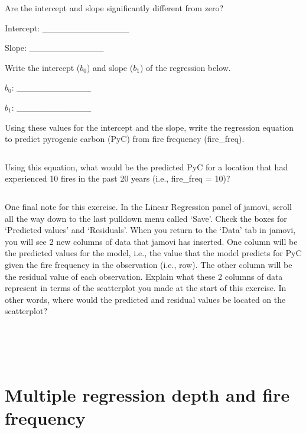 \documentclass[
  openany]{scrbook}
\begin{document}
Are the intercept and slope significantly different from zero?

Intercept: \_\_\_\_\_\_\_\_\_\_\_\_\_\_

Slope: \_\_\_\_\_\_\_\_\_\_\_\_

Write the intercept (\(b_{0}\)) and slope (\(b_{1}\)) of the regression below.

\(b_{0}\): \_\_\_\_\_\_\_\_\_\_\_\_

\(b_{1}\): \_\_\_\_\_\_\_\_\_\_\_\_

Using these values for the intercept and the slope, write the regression equation to predict pyrogenic carbon (PyC) from fire frequency (fire\_freq).

\begin{verbatim}

\end{verbatim}

Using this equation, what would be the predicted PyC for a location that had experienced 10 fires in the past 20 years (i.e., fire\_freq = 10)?

\begin{verbatim}

\end{verbatim}

One final note for this exercise.
In the Linear Regression panel of jamovi, scroll all the way down to the last pulldown menu called `Save'.
Check the boxes for `Predicted values' and `Residuals'.
When you return to the `Data' tab in jamovi, you will see 2 new columns of data that jamovi has inserted.
One column will be the predicted values for the model, i.e., the value that the model predicts for PyC given the fire frequency in the observation (i.e., row).
The other column will be the residual value of each observation.
Explain what these 2 columns of data represent in terms of the scatterplot you made at the start of this exercise.
In other words, where would the predicted and residual values be located on the scatterplot?

\begin{verbatim}




\end{verbatim}

\hypertarget{multiple-regression-depth-and-fire-frequency}{%
\section{Multiple regression depth and fire frequency}\label{multiple-regression-depth-and-fire-frequency}}
\end{document}
